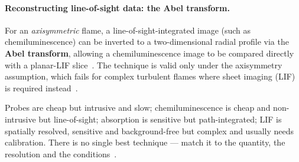 \paragraph{Reconstructing line-of-sight data: the Abel transform.} For an \emph{axisymmetric} flame, a line-of-sight-integrated image (such as chemiluminescence) can be inverted to a two-dimensional radial profile via the \textbf{Abel transform}, allowing a chemiluminescence image to be compared directly with a planar-LIF slice~\cite{transcript_l7}. The technique is valid only under the axisymmetry assumption, which fails for complex turbulent flames where sheet imaging (LIF) is required instead~\cite{transcript_l7}.

\begin{keybox}
Probes are cheap but intrusive and slow; chemiluminescence is cheap and non-intrusive but line-of-sight; absorption is sensitive but path-integrated; LIF is spatially resolved, sensitive and background-free but complex and usually needs calibration. There is no single best technique --- match it to the quantity, the resolution and the conditions~\cite{lecture6,lecture7}.
\end{keybox}
